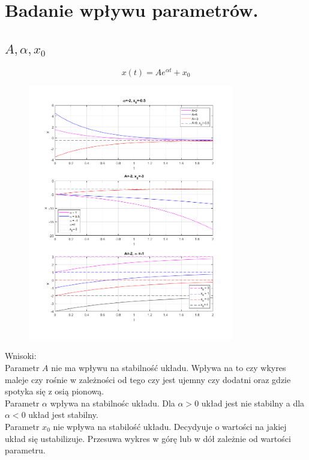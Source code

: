 \documentclass{article}
\begin{document}
\newpage
\section{Badanie wpływu parametrów.}
\subsection{$A,\alpha,x_0$}
$$
x(t)=Ae^{\alpha t}+x_0
$$

\begin{figure}[h]
    \centering
    \includegraphics[width=0.8\textwidth]{a_graphs.png}
    \label{fig:my_label}
\end{figure}
\begin{flushleft}
Wnisoki:\\
Parametr $A$ nie ma wpływu na stabilność układu. Wpływa na to czy wkyres maleje czy rośnie w zależności od tego czy jest ujemny czy dodatni oraz gdzie spotyka się z osią pionową.\\
Parametr $\alpha$ wpływa na stabilnośc układu. Dla $\alpha > 0$ układ jest nie stabilny a dla $\alpha < 0 $ układ jest stabilny.\\
Parametr $x_0$ nie wpływa na stabilość układu. Decydyuje o wartości na jakiej układ się ustabilizuje. Przesuwa wykres w górę lub w dół zależnie od wartości parametru.
\end{flushleft}
\end{document}
